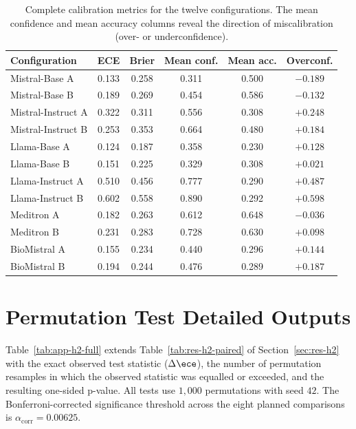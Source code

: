 \begin{table}[htbp]
    \centering
    \caption{Complete calibration metrics for the twelve configurations. 
        The mean confidence and mean accuracy columns reveal the direction 
        of miscalibration (over- or underconfidence).}
    \label{tab:app-calibration-full}
    \small
    \begin{tabular}{@{}lccccc@{}}
        \toprule
        \textbf{Configuration} & 
        \textbf{ECE} & 
        \textbf{Brier} & 
        \textbf{Mean conf.} & 
        \textbf{Mean acc.} & 
        \textbf{Overconf.} \\
        \midrule
        Mistral-Base A     & 0.133 & 0.258 & 0.311 & 0.500 & $-0.189$ \\
        Mistral-Base B     & 0.189 & 0.269 & 0.454 & 0.586 & $-0.132$ \\
        Mistral-Instruct A & 0.322 & 0.311 & 0.556 & 0.308 & $+0.248$ \\
        Mistral-Instruct B & 0.253 & 0.353 & 0.664 & 0.480 & $+0.184$ \\
        Llama-Base A       & 0.124 & 0.187 & 0.358 & 0.230 & $+0.128$ \\
        Llama-Base B       & 0.151 & 0.225 & 0.329 & 0.308 & $+0.021$ \\
        Llama-Instruct A   & 0.510 & 0.456 & 0.777 & 0.290 & $+0.487$ \\
        Llama-Instruct B   & 0.602 & 0.558 & 0.890 & 0.292 & $+0.598$ \\
        Meditron A         & 0.182 & 0.263 & 0.612 & 0.648 & $-0.036$ \\
        Meditron B         & 0.231 & 0.283 & 0.728 & 0.630 & $+0.098$ \\
        BioMistral A       & 0.155 & 0.234 & 0.440 & 0.296 & $+0.144$ \\
        BioMistral B       & 0.194 & 0.244 & 0.476 & 0.289 & $+0.187$ \\
        \bottomrule
    \end{tabular}
\end{table}

\section{Permutation Test Detailed Outputs}
\label{sec:app-permutation-full}

Table~\ref{tab:app-h2-full} extends Table~\ref{tab:res-h2-paired} of 
Section~\ref{sec:res-h2} with the exact observed test statistic 
($\Delta\ece$), the number of permutation resamples in which the 
observed statistic was equalled or exceeded, and the resulting 
one-sided p-value. All tests use $1{,}000$ permutations with seed $42$. 
The Bonferroni-corrected significance threshold across the eight 
planned comparisons is $\alpha_{\text{corr}} = 0.00625$.

